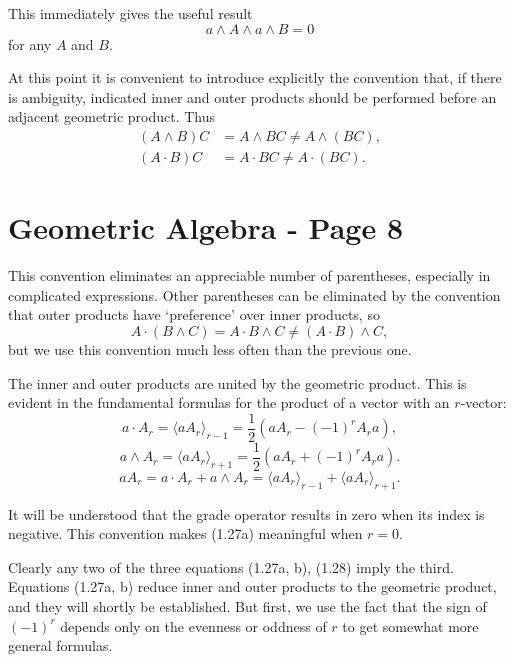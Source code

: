 \documentclass[fleqn]{scrartcl}
\numberwithin{equation}{section}
\begin{document}
\noindent This immediately gives the useful result
\begin{equation}
a \wedge A \wedge a \wedge B = 0 \tag{1.26b}
\end{equation}
for any \(A\) and \(B\).

\vspace{1em}
\noindent At this point it is convenient to introduce explicitly the convention that, if there is ambiguity, indicated inner and outer products should be performed before an adjacent geometric product. Thus
\begin{align*}
(A \wedge B)C &= A \wedge BC \neq A \wedge (BC), \\
(A \cdot B)C &= A \cdot BC \neq A \cdot (BC).
\end{align*}

\section*{Geometric Algebra - Page 8}

\noindent This convention eliminates an appreciable number of parentheses, especially in complicated expressions. Other parentheses can be eliminated by the convention that outer products have `preference' over inner products, so
\[
A \cdot (B \wedge C) = A \cdot B \wedge C \neq (A \cdot B) \wedge C,
\]
but we use this convention much less often than the previous one.

\vspace{1em}
\noindent The inner and outer products are united by the geometric product. This is evident in the fundamental formulas for the product of a vector with an \(r\)-vector:
\begin{equation}
a \cdot A_r = \langle a A_r \rangle_{r-1} = \frac{1}{2}(a A_r - (-1)^r A_r a), \tag{1.27a}
\end{equation}
\begin{equation}
a \wedge A_r = \langle a A_r \rangle_{r+1} = \frac{1}{2}(a A_r + (-1)^r A_r a). \tag{1.27b}
\end{equation}
\begin{equation}
a A_r = a \cdot A_r + a \wedge A_r = \langle a A_r \rangle_{r-1} + \langle a A_r \rangle_{r+1}. \tag{1.28}
\end{equation}

\noindent It will be understood that the grade operator results in zero when its index is negative. This convention makes (1.27a) meaningful when \(r = 0\).

\vspace{1em}
\noindent Clearly any two of the three equations (1.27a, b), (1.28) imply the third. Equations (1.27a, b) reduce inner and outer products to the geometric product, and they will shortly be established. But first, we use the fact that the sign of \((-1)^r\) depends only on the evenness or oddness of \(r\) to get somewhat more general formulas.
\end{document}

